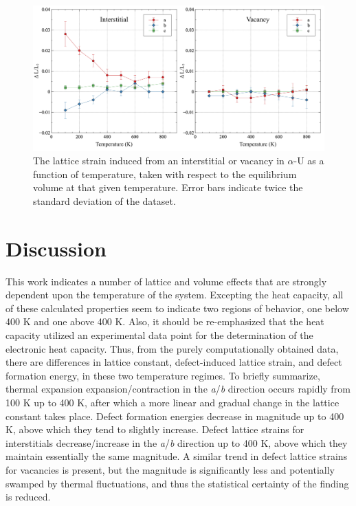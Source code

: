 \documentclass[utf8]{frontiersSCNS} %
\begin{document}
 \begin{figure}[hbt]
	\centering
	\includegraphics[width=1.0\textwidth]{defect_strain.jpg}
    \caption{The lattice strain induced from an interstitial or vacancy in $\alpha$-U as a function of temperature, taken with respect to the equilibrium volume at that given temperature. Error bars indicate twice the standard deviation of the dataset.}\label{fig:strain}
\end{figure}

\FloatBarrier

\section{Discussion}

This work indicates a number of lattice and volume effects that are strongly dependent upon the temperature of the system. Excepting the heat capacity, all of these calculated properties seem to indicate two regions of behavior, one below 400 K and one above 400 K. Also, it should be re-emphasized that the heat capacity utilized an experimental data point for the determination of the electronic heat capacity. Thus, from the purely computationally obtained data, there are differences in lattice constant, defect-induced lattice strain, and defect formation energy, in these two temperature regimes. To briefly summarize, thermal expansion expansion/contraction in the \textit{a}/\textit{b} direction occurs rapidly from 100 K up to 400 K, after which a more linear and gradual change in the lattice constant takes place. Defect formation energies decrease in magnitude up to 400 K, above which they tend to slightly increase. Defect lattice strains for interstitials decrease/increase in the \textit{a}/\textit{b} direction up to 400 K, above which they maintain essentially the same magnitude. A similar trend in defect lattice strains for vacancies is present, but the magnitude is significantly less and potentially swamped by thermal fluctuations, and thus the statistical certainty of the finding is reduced. 
\end{document}
